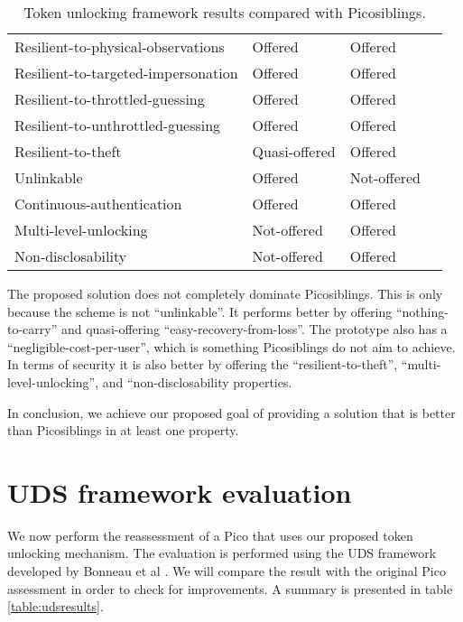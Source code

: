 \begin{table}
\begin{tabular}{l|l|l|l}
    Resilient-to-physical-observations  & \cellcolor{green!25}Offered       	& \cellcolor{green!25}Offered          	\\
    Resilient-to-targeted-impersonation & \cellcolor{green!25}Offered       	& \cellcolor{green!25}Offered      		\\
    Resilient-to-throttled-guessing     & \cellcolor{green!25}Offered       	& \cellcolor{green!25}Offered          	\\
    Resilient-to-unthrottled-guessing   & \cellcolor{green!25}Offered       	& \cellcolor{green!25}Offered          	\\
    Resilient-to-theft                  & \cellcolor{yellow!25}Quasi-offered   	& \cellcolor{green!25}Offered          	\\
    Unlinkable                          & \cellcolor{green!25}Offered       	& \cellcolor{red!25}Not-offered      	\\
    Continuous-authentication           & \cellcolor{green!25}Offered       	& \cellcolor{green!25}Offered      		\\
    Multi-level-unlocking               & \cellcolor{red!25}Not-offered   		& \cellcolor{green!25}Offered      		\\
    Non-disclosability                  & \cellcolor{red!25}Not-offered   		& \cellcolor{green!25}Offered    		\\
    \end{tabular}

	\caption{Token unlocking framework results compared with Picosiblings.}
	\label{table:tokenresults}

\end{table}

The proposed solution does not completely dominate Picosiblings. This is only because the scheme is not ``unlinkable''. It performs better by offering ``nothing-to-carry'' and quasi-offering ``easy-recovery-from-loss''. The prototype also has a ``negligible-cost-per-user'', which is something Picosiblings do not aim to achieve. In terms of security it is also better by offering the ``resilient-to-theft'', ``multi-level-unlocking'', and ``non-disclosability properties. 

In conclusion, we achieve our proposed goal of providing a solution that is better than Picosiblings in at least one property.

\section{UDS framework evaluation}
We now perform the reassessment of a Pico that uses our proposed token unlocking mechanism. The evaluation is performed using the UDS framework developed by Bonneau et al \cite{bonneau2012quest}. We will compare the result with the original Pico assessment in order to check for improvements. A summary is presented in table \ref{table:udsresults}.

